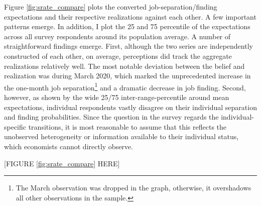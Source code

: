 Figure \ref{fig:srate_compare} plots the converted job-separation/finding expectations and their respective realizations against each other. A few important patterns emerge. In addition, I plot the 25 and 75 percentile of the expectations across all survey respondents around its population average. A number of straightforward findings emerge. First, although the two series are independently constructed of each other, on average, perceptions did track the aggregate realizations relatively well. The most notable deviation between the belief and realization was during March 2020, which marked the unprecedented increase in the one-month job separation\footnote{The March observation was dropped in the graph, otherwise, it overshadows all other observations in the sample.} and a dramatic decrease in job finding. Second, however, as shown by the wide 25/75 inter-range-percentile around mean expectations, individual respondents vastly disagree on their individual separation and finding probabilities. Since the question in the survey regards the individual-specific transitions, it is most reasonable to assume that this reflects the unobserved heterogeneity or information available to their individual status, which economists cannot directly observe. 



\begin{center}
[FIGURE \ref{fig:srate_compare} HERE]
\end{center}



